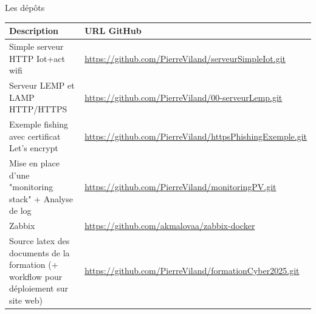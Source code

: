 \documentclass[12pt, handout]{beamer}
\begin{document}
\begin{frame}{Les dépôts }
\footnotesize
\begin{tabular}{|>{\raggedright\arraybackslash}p{5cm}|>{\raggedright\arraybackslash}p{6cm}|}
\hline
\rowcolor{vert_capet} \textbf{Description} & \textbf{URL GitHub} \\
\hline
Simple serveur HTTP Iot+act wifi& \url{https://github.com/PierreViland/serveurSimpleIot.git} \\


\hline
Serveur LEMP et LAMP HTTP/HTTPS& \url{https://github.com/PierreViland/00-serveurLemp.git} \\
\hline
Exemple fishing avec certificat Let's encrypt& \url{https://github.com/PierreViland/httpsPhishingExemple.git} \\
\hline
Mise en place d'une "monitoring stack" + Analyse de log & \url{https://github.com/PierreViland/monitoringPV.git} \\
\hline
Zabbix & \url{https://github.com/akmalovaa/zabbix-docker} \\
\hline
Source latex des documents de la formation (+ workflow pour déploiement sur site web) & \url{https://github.com/PierreViland/formationCyber2025.git} \\
\hline
\end{tabular}

\normalsize
\end{frame}
\end{document}
